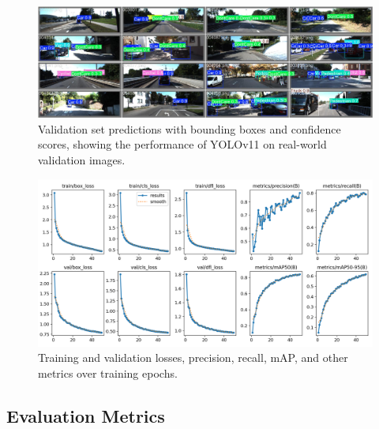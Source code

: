 \documentclass[12pt]{article}
\begin{document}
\begin{figure}[h]
    \centering
    \includegraphics[width=\textwidth]{images/val_batch2_pred.jpg}
    \caption{Validation set predictions with bounding boxes and confidence scores, showing the performance of YOLOv11 on real-world validation images.}
    \label{fig:validation_predictions}
\end{figure}

\begin{figure}[h]
    \centering
    \includegraphics[width=\textwidth]{images/results.png}
    \caption{Training and validation losses, precision, recall, mAP, and other metrics over training epochs.}
    \label{fig:training_performance}
\end{figure}

\subsection{Evaluation Metrics}
\end{document}
